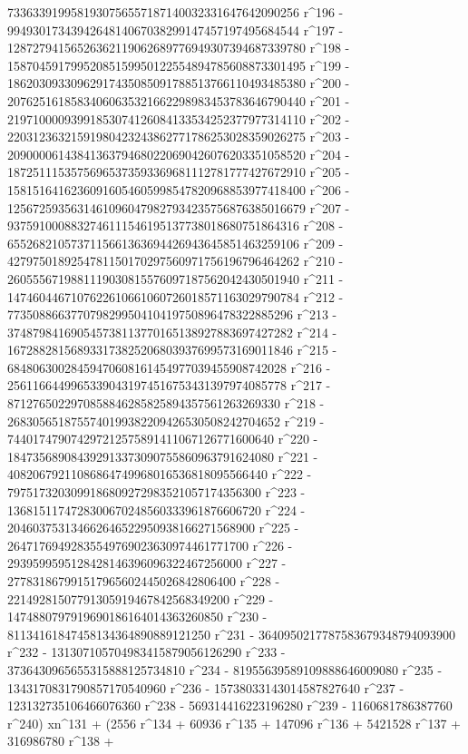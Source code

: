        7336339199581930756557187140032331647642090256 r^196 - 
       9949301734394264814067038299147457197495684544 r^197 - 
       12872794156526362119062689776949307394687339780 r^198 - 
       15870459179952085159950122554894785608873301495 r^199 - 
       18620309330962917435085091788513766110493485380 r^200 - 
       20762516185834060635321662298983453783646790440 r^201 - 
       21971000093991853074126084133534252377977314110 r^202 - 
       22031236321591980423243862771786253028359026275 r^203 - 
       20900006143841363794680220690426076203351058520 r^204 - 
       18725111535756965373593369681112781777427672910 r^205 - 
       15815164162360916054605998547820968853977418400 r^206 - 
       12567259356314610960479827934235756876385016679 r^207 - 
       9375910008832746111546195137738018680751864316 r^208 - 
       6552682105737115661363694426943645851463259106 r^209 - 
       4279750189254781150170297560971756196796464262 r^210 - 
       2605556719881119030815576097187562042430501940 r^211 - 
       1474604467107622610661060726018571163029790784 r^212 - 
       773508866377079829950410419750896478322885296 r^213 - 
       374879841690545738113770165138927883697427282 r^214 - 
       167288281568933173825206803937699573169011846 r^215 - 
       68480630028459470608161454977039455908742028 r^216 - 
       25611664499653390431974516753431397974085778 r^217 - 
       8712765022970858846285825894357561263269330 r^218 - 
       2683056518755740199382209426530508242704652 r^219 - 
       744017479074297212575891411067126771600640 r^220 - 
       184735689084392913373090755860963791624080 r^221 - 
       40820679211086864749968016536818095566440 r^222 - 
       7975173203099186809272983521057174356300 r^223 - 
       1368151174728300670248560333961876606720 r^224 - 
       204603753134662646522950938166271568900 r^225 - 
       26471769492835549769023630974461771700 r^226 - 
       2939599595128428146396096322467256000 r^227 - 
       277831867991517965602445026842806400 r^228 - 
       22149281507791305919467842568349200 r^229 - 
       1474880797919690186164014363260850 r^230 - 
       81134161847458134364890889121250 r^231 - 
       3640950217787583679348794093900 r^232 - 
       131307105704983415879056126290 r^233 - 
       3736430965655315888125734810 r^234 - 
       81955639589109888646009080 r^235 - 
       1343170831790857170540960 r^236 - 
       15738033143014587827640 r^237 - 123132735106466076360 r^238 - 
       569314416223196280 r^239 - 
       1160681786387760 r^240) xn^131 + (2556 r^134 + 60936 r^135 + 
       147096 r^136 + 5421528 r^137 + 316986780 r^138 + 
